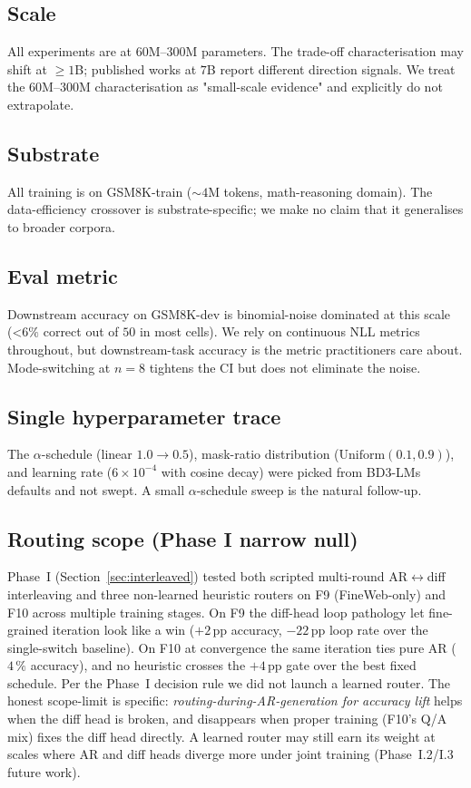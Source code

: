 \subsection{Scale}

All experiments are at $60$M--$300$M parameters. The trade-off
characterisation may shift at $\ge 1$B; published works at $7$B
\citep{zhou2024transfusion,gong2024diffullama} report different
direction signals. We treat the $60$M--$300$M characterisation as
"small-scale evidence" and explicitly do not extrapolate.

\subsection{Substrate}

All training is on GSM8K-train ($\sim 4$M tokens, math-reasoning
domain). The data-efficiency crossover is substrate-specific; we
make no claim that it generalises to broader corpora.

\subsection{Eval metric}

Downstream accuracy on GSM8K-dev is binomial-noise dominated at this
scale (\textless $6\%$ correct out of $50$ in most cells). We rely
on continuous NLL metrics throughout, but downstream-task accuracy
is the metric practitioners care about. Mode-switching at $n=8$
tightens the CI but does not eliminate the noise.

\subsection{Single hyperparameter trace}

The $\alpha$-schedule (linear $1.0 \to 0.5$), mask-ratio distribution
($\text{Uniform}(0.1, 0.9)$), and learning rate ($6\times 10^{-4}$
with cosine decay) were picked from BD3-LMs defaults and not swept.
A small $\alpha$-schedule sweep is the natural follow-up.

\subsection{Routing scope (Phase I narrow null)}

Phase~I (Section~\ref{sec:interleaved}) tested both scripted multi-round
AR$\leftrightarrow$diff interleaving and three non-learned heuristic
routers on F9 (FineWeb-only) and F10 across multiple training stages.
On F9 the diff-head loop pathology let fine-grained iteration look
like a win ($+2$\,pp accuracy, $-22$\,pp loop rate over the
single-switch baseline). On F10 at convergence the same iteration
ties pure AR ($4\,\%$ accuracy), and no heuristic crosses the
$+4$\,pp gate over the best fixed schedule. Per the Phase~I decision
rule we did not launch a learned router. The honest scope-limit is
specific: \emph{routing-during-AR-generation for accuracy lift} helps
when the diff head is broken, and disappears when proper training
(F10's Q/A mix) fixes the diff head directly. A learned router may
still earn its weight at scales where AR and diff heads diverge more
under joint training (Phase~I.2/I.3 future work).

